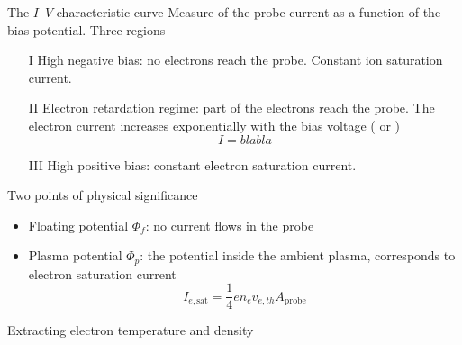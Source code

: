 \documentclass[10pt]{beamer}
\newcommand{\electronsaturationcurrent}[0]{\ensuremath{I_{e,{\mathrm{sat}}}}}
\begin{document}
\begin{frame}{The $I$--$V$ characteristic curve}
    Measure of the probe current as a function of the bias potential.
    Three regions
    \begin{enumerate}
        \item[I] High negative bias: no electrons reach the probe. Constant ion saturation current.
        \item[II] Electron retardation regime: part of the electrons reach the probe. The electron current increases exponentially with the bias voltage ( or )
            \begin{equation*}
                I = blabla
            \end{equation*}
        \item[III] High positive bias: constant electron saturation current.
    \end{enumerate}
    Two points of physical significance
    \begin{itemize}
        \item Floating potential $\Phi_f$: no current flows in the probe
        \item Plasma potential $\Phi_p$: the potential inside the ambient plasma, corresponds to electron saturation current
            \begin{equation*}
                \electronsaturationcurrent = \frac{1}{4}e n_e v_{e,th} A_{\mathrm{probe}}
            \end{equation*}
    \end{itemize}
\end{frame}

\begin{frame}{Extracting electron temperature and density}

\end{frame}
\end{document}

